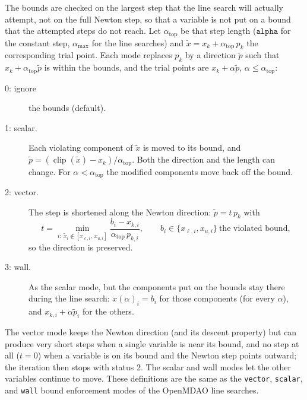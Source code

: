 \documentclass[11pt]{article}
\newcommand{\code}[1]{\texttt{#1}}
\begin{document}
The bounds are checked on the largest step that the line search will actually attempt, not on the full
Newton step, so that a variable is not put on a bound that the attempted steps do not reach. Let
$\alpha_{\text{top}}$ be that step length ($\code{alpha}$ for the constant step, $\alpha_{\max}$ for the
line searches) and $\tilde x = x_k + \alpha_{\text{top}}\, p_k$ the corresponding trial point. Each mode
replaces $p_k$ by a direction $\tilde p$ such that $x_k + \alpha_{\text{top}} \tilde p$ is within the bounds,
and the trial points are $x_k + \alpha \tilde p$, $\alpha \le \alpha_{\text{top}}$:
\begin{description}
  \item[0: ignore] the bounds (default).
  \item[1: scalar.] Each violating component of $\tilde x$ is moved to its bound, and
  $\tilde p = (\operatorname{clip}(\tilde x) - x_k)/\alpha_{\text{top}}$. Both the direction and the length can
  change. For $\alpha < \alpha_{\text{top}}$ the modified components move back off the bound.
  \item[2: vector.] The step is shortened along the Newton direction:
  $\tilde p = t\, p_k$ with
  \begin{equation}
     t = \min_{i:\ \tilde x_i \notin [x_{\ell,i},\, x_{u,i}]} \frac{b_i - x_{k,i}}{\alpha_{\text{top}}\, p_{k,i}},
     \qquad b_i \in \{x_{\ell,i}, x_{u,i}\}\ \text{the violated bound},
  \end{equation}
  so the direction is preserved.
  \item[3: wall.] As the scalar mode, but the components put on the bounds stay there during the line
  search: $x(\alpha)_i = b_i$ for those components (for every $\alpha$), and $x_{k,i} + \alpha \tilde p_i$ for
  the others.
\end{description}
The vector mode keeps the Newton direction (and its descent property) but can produce very short steps
when a single variable is near its bound, and no step at all ($t = 0$) when a variable is on its bound and
the Newton step points outward; the iteration then stops with status 2. The scalar and wall modes let the
other variables continue to move. These definitions are the same as the \code{vector}, \code{scalar}, and
\code{wall} bound enforcement modes of the OpenMDAO line searches.
\end{document}
